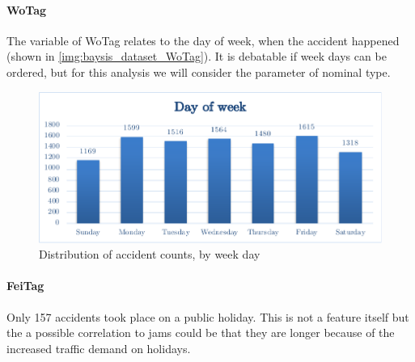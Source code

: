 \paragraph{WoTag}
\label{baysis_dataset_WoTag}
The variable of WoTag relates to the day of week, when the accident happened (shown in \autoref{img:baysis_dataset_WoTag}). It is debatable if week days can be ordered, but for this analysis we will consider the parameter of nominal type.
\begin{figure}[ht]
	\centering
	\includegraphics[scale=0.75]{images/baysis_dataset_WoTag.pdf}
	\caption{Distribution of accident counts, by week day}
	\label{img:baysis_dataset_WoTag}
	\vspace{-8mm}
\end{figure}

\paragraph{FeiTag}
\label{baysis_dataset_FeiTag}
Only 157 accidents took place on a public holiday. This is not a feature itself but the a possible correlation to jams could be that they are longer because of the increased traffic demand on holidays.
	


